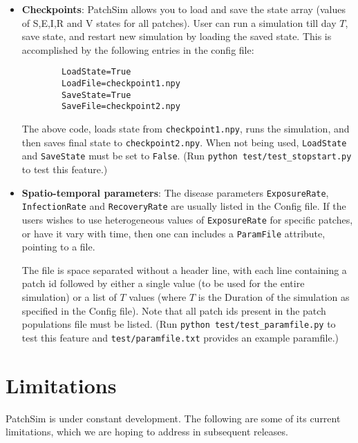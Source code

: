 \documentclass[10pt]{scrartcl}
\theoremstyle{definition}
\begin{document}
\begin{itemize}
	\item \textbf{Checkpoints}: PatchSim allows you to load and save the state 
	array (values of S,E,I,R and V states for all patches). User can run a 
	simulation till day $T$, save state, and restart new simulation by loading 
	the saved state. This is accomplished by the following entries in the 
	config file:
	
	\begin{center}
		\begin{lstlisting}
		LoadState=True
		LoadFile=checkpoint1.npy
		SaveState=True
		SaveFile=checkpoint2.npy
		\end{lstlisting}
	\end{center}
	
	The above code, loads state from \verb|checkpoint1.npy|, runs the 
	simulation, and then saves final state to \verb|checkpoint2.npy|. When not 
	being used, \verb|LoadState| and \verb|SaveState| must be set to 
	\verb|False|.
	(Run \verb|python test/test_stopstart.py| to test this feature.)
	
	\item \textbf{Spatio-temporal parameters}: The disease parameters 
	\verb|ExposureRate|, \verb|InfectionRate| and \verb|RecoveryRate| are 
	usually listed in the Config file. If the users wishes to use heterogeneous values of \verb|ExposureRate|
	for specific patches, or have it vary with time,  then one can includes
	a \verb|ParamFile| attribute, pointing to a file.
	
	The file is space separated without a header line, with each line containing a patch id followed by either a single value (to be used for the entire simulation) or a list of $T$ values (where $T$ is the Duration of the simulation as specified in the Config file). Note that all patch ids present in the patch populations file must 
	be listed. (Run \verb|python test/test_paramfile.py| to test this feature and \verb|test/paramfile.txt| provides an example paramfile.)
	
\end{itemize}

\section{Limitations}
PatchSim is under constant development. The following are some of its current 
limitations, which we are hoping to address in subsequent releases.
\end{document}
